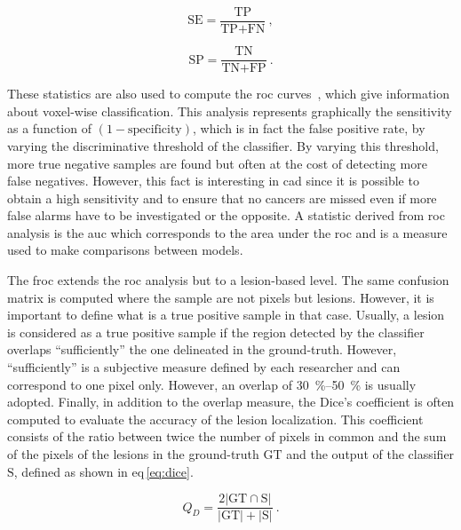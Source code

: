 \begin{equation}
  \text{SE} = \frac{\text{TP}}{\text{TP} + \text{FN}} \ ,
  \label{eq:sens}
\end{equation}

\begin{equation}
  \text{SP} = \frac{\text{TN}}{\text{TN} + \text{FP}} \ .
  \label{eq:spec}
\end{equation}

These statistics are also used to compute the \ac{roc} curves~\cite{Metz2006},
which give information about voxel-wise classification.
This analysis represents graphically the sensitivity as a function of $(1 -
\text{specificity})$, which is in fact the false positive rate, by varying the
discriminative threshold of the classifier.
By varying this threshold, more true negative samples are found but often at
the cost of detecting more false negatives.
However, this fact is interesting in \ac{cad} since it is possible to obtain a
high sensitivity and to ensure that no cancers are missed even if more false
alarms have to be investigated or the opposite.
A statistic derived from \ac{roc} analysis is the \acf{auc} which corresponds
to the area under the \ac{roc} and is a measure used to make comparisons
between models.

The \acf{froc} extends the \ac{roc} analysis but to a lesion-based level.
The same confusion matrix is computed where the sample are not pixels but
lesions.
However, it is important to define what is a true positive sample in that case.
Usually, a lesion is considered as a true positive sample if the region
detected by the classifier overlaps ``sufficiently'' the one delineated in the
ground-truth.
However, ``sufficiently'' is a subjective measure defined by each researcher
and can correspond to one pixel only.
However, an overlap of \SIrange{30}{50}{\percent} is usually adopted.
Finally, in addition to the overlap measure, the Dice's coefficient is often
computed to evaluate the accuracy of the lesion localization.
This coefficient consists of the ratio between twice the number of pixels in
common and the sum of the pixels of the lesions in the ground-truth $\text{GT}$
and the output of the classifier $\text{S}$, defined as shown in
\acs{eq}\,\eqref{eq:dice}.

\begin{equation}
  Q_D = \frac{2 | \text{GT} \cap \text{S} |}{| \text{GT} | + | \text{S} |} \ .
  \label{eq:dice}
\end{equation}
